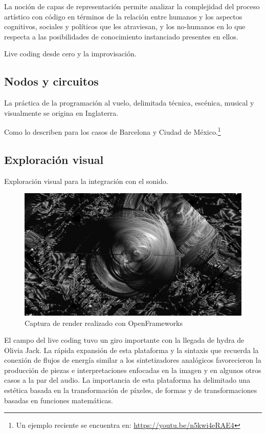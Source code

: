 La noción de capas de representación permite analizar la complejidad del proceso artístico con código en términos de la relación entre humanos y los aspectos cognitivos, sociales y políticos que les atraviesan, y los no-humanos en lo que respecta a las posibilidades de conocimiento instanciado presentes en ellos. 

Live coding desde cero y la improvisación. 

\subsection{Nodos y circuitos}

La práctica de la programación al vuelo, delimitada técnica, escénica, musical y visualmente se origina en Inglaterra. %

Como lo describen \cite{villasenor} para los casos de Barcelona y Ciudad de México.\footnote{Un ejemplo reciente se encuentra en: \url{https://youtu.be/n5kwi4eRAE4}} 

\subsection{Exploración visual}

Exploración visual para la integración con el sonido.  

\begin{figure}[tb]
\centering 
\includegraphics[width=\columnwidth]{../img/of13.png} 
\caption[Openframeworks 1]{Captura de render realizado con OpenFrameworks} %
\label{fig:gallery} 
\end{figure}

El campo del live coding tuvo un giro importante con la llegada de hydra de Olivia Jack. La rápida expansión de esta plataforma y la sintaxis que recuerda la conexión de flujos de energía similar a los sintetizadores analógicos favorecieron la producción de piezas e interpretaciones enfocadas en la imagen y en algunos otros casos a la par del audio. La importancia de esta plataforma ha delimitado una estética  basada en  la transformación de píxeles, de formas y de transformaciones basadas en funciones matemáticas.

